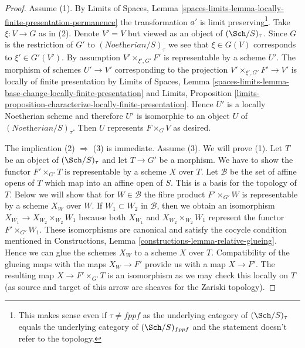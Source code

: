 \begin{proof}
Assume (1). By Limits of Spaces, Lemma
\ref{spaces-limits-lemma-locally-finite-presentation-permanence}
the transformation $a'$ is limit preserving\footnote{This
makes sense even if $\tau \not = fppf$ as the underlying
category of $(\Sch/S)_\tau$ equals the underlying category
of $(\Sch/S)_{fppf}$ and the statement doesn't refer to the topology.}.
Take $\xi : V \to G$ as in (2). Denote $V' = V$ but viewed as an
object of $(\Sch/S)_\tau$. Since $G$ is the restriction of
$G'$ to $(\textit{Noetherian}/S)_\tau$ we see that
$\xi \in G(V)$ corresponds to $\xi' \in G'(V')$.
By assumption $V' \times_{\xi', G'} F'$ is representable
by a scheme $U'$. The morphism of schemes $U' \to V'$ corresponding to
the projection $V' \times_{\xi', G'} F' \to V'$ is locally of finite
presentation by
Limits of Spaces, Lemma
\ref{spaces-limits-lemma-base-change-locally-finite-presentation} and
Limits, Proposition
\ref{limits-proposition-characterize-locally-finite-presentation}.
Hence $U'$ is a locally Noetherian scheme and therefore $U'$ is
isomorphic to an object $U$ of $(\textit{Noetherian}/S)_\tau$.
Then $U$ represents $F \times_G V$ as desired.

\medskip\noindent
The implication (2) $\Rightarrow$ (3) is immediate. Assume (3).
We will prove (1). Let $T$ be an object of $(\Sch/S)_\tau$
and let $T \to G'$ be a morphism. We have to show
the functor $F' \times_{G'} T$ is representable by a scheme $X$
over $T$. Let $\mathcal{B}$ be the set of affine opens of
$T$ which map into an affine open of $S$. This is a basis
for the topology of $T$. Below we will show that for $W \in \mathcal{B}$
the fibre product $F' \times_{G'} W$ is representable
by a scheme $X_W$ over $W$. If $W_1 \subset W_2$ in $\mathcal{B}$, then
we obtain an isomorphism $X_{W_1} \to X_{W_2} \times_{W_2} W_1$ because both
$X_{W_1}$ and $X_{W_2} \times_{W_2} W_1$ represent the functor
$F' \times_{G'} W_1$.
These isomorphisms are canonical and satisfy the cocycle condition
mentioned in Constructions, Lemma
\ref{constructions-lemma-relative-glueing}.
Hence we can glue the schemes $X_W$ to a scheme $X$ over $T$.
Compatibility of the glueing maps with the maps
$X_W \to F'$ provide us with a map $X \to F'$.
The resulting map $X \to F' \times_{G'} T$ is an
isomorphism as we may check this locally on $T$ (as source
and target of this arrow are sheaves for the Zariski topology).


\end{proof}
